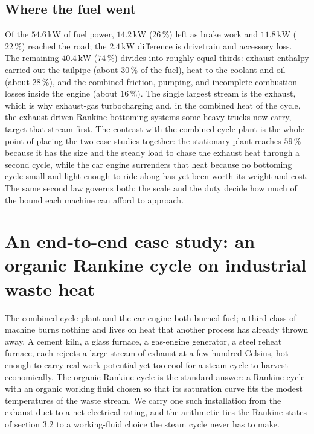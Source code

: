 \subsection{Where the fuel went}

Of the $54.6\,\text{kW}$ of fuel power, $14.2\,\text{kW}$ ($26\,\%$) left as
brake work and $11.8\,\text{kW}$ ($22\,\%$) reached the road; the
$2.4\,\text{kW}$ difference is drivetrain and accessory loss. The remaining
$40.4\,\text{kW}$ ($74\,\%$) divides into roughly equal thirds: exhaust enthalpy
carried out the tailpipe (about $30\,\%$ of the fuel), heat to the coolant and
oil (about $28\,\%$), and the combined friction, pumping, and incomplete
combustion losses inside the engine (about $16\,\%$). The single largest stream
is the exhaust, which is why exhaust-gas turbocharging and, in the combined
heat of the cycle, the exhaust-driven Rankine bottoming systems some heavy
trucks now carry, target that stream first. The contrast with the
combined-cycle plant is the whole point of placing the two case studies
together: the stationary plant reaches $59\,\%$ because it has the size and the
steady load to chase the exhaust heat through a second cycle, while the car
engine surrenders that heat because no bottoming cycle small and light enough to
ride along has yet been worth its weight and cost. The same second law governs
both; the scale and the duty decide how much of the bound each machine can
afford to approach.

\section{An end-to-end case study: an organic Rankine cycle on industrial waste heat}

The combined-cycle plant and the car engine both burned fuel; a third class of
machine burns nothing and lives on heat that another process has already thrown
away. A cement kiln, a glass furnace, a gas-engine generator, a steel reheat
furnace, each rejects a large stream of exhaust at a few hundred Celsius, hot
enough to carry real work potential yet too cool for a steam cycle to harvest
economically. The organic Rankine cycle is the standard answer: a Rankine cycle
with an organic working fluid chosen so that its saturation curve fits the modest
temperatures of the waste stream. We carry one such installation from the
exhaust duct to a net electrical rating, and the arithmetic ties the Rankine
states of section 3.2 to a working-fluid choice the steam cycle never has to make.

